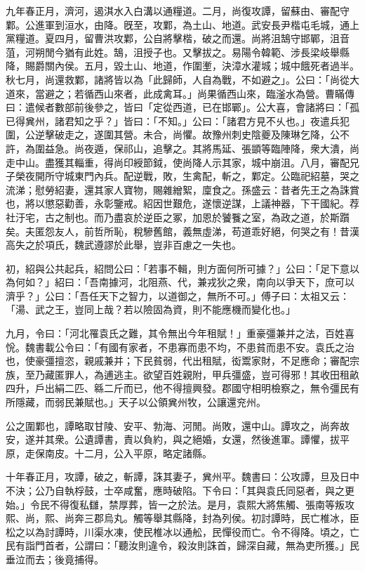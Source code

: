 \begin{pinyinscope}
九年春正月，濟河，遏淇水入白溝以通糧道。二月，尚復攻譚，留蘇由、審配守鄴。公進軍到洹水，由降。旣至，攻鄴，為土山、地道。武安長尹楷屯毛城，通上黨糧道。夏四月，留曹洪攻鄴，公自將擊楷，破之而還。尚將沮鵠守邯鄲，沮音菹，河朔閒今猶有此姓。鵠，沮授子也。又擊拔之。易陽令韓範、涉長梁岐舉縣降，賜爵關內侯。五月，毀土山、地道，作圍壍，決漳水灌城；城中餓死者過半。秋七月，尚還救鄴，諸將皆以為「此歸師，人自為戰，不如避之」。公曰：「尚從大道來，當避之；若循西山來者，此成禽耳。」尚果循西山來，臨滏水為營。曹瞞傳曰：遣候者數部前後參之，皆曰「定從西道，已在邯鄲」。公大喜，會諸將曰：「孤已得兾州，諸君知之乎？」皆曰：「不知。」公曰：「諸君方見不乆也。」夜遣兵犯圍，公逆擊破走之，遂圍其營。未合，尚懼。故豫州刺史陰夔及陳琳乞降，公不許，為圍益急。尚夜遁，保祁山，追擊之。其將馬延、張顗等臨陣降，衆大潰，尚走中山。盡獲其輜重，得尚印綬節鉞，使尚降人示其家，城中崩沮。八月，審配兄子榮夜開所守城東門內兵。配逆戰，敗，生禽配，斬之，鄴定。公臨祀紹墓，哭之流涕；慰勞紹妻，還其家人寶物，賜雜繒絮，廩食之。孫盛云：昔者先王之為誅賞也，將以懲惡勸善，永彰鑒戒。紹因世艱危，遂懷逆謀，上議神器，下干國紀。荐社汙宅，古之制也。而乃盡哀於逆臣之冢，加恩於饕餮之室，為政之道，於斯躓矣。夫匿怨友人，前哲所恥，稅驂舊館，義無虛涕，苟道乖好絕，何哭之有！昔漢高失之於項氏，魏武遵謬於此舉，豈非百慮之一失也。

初，紹與公共起兵，紹問公曰：「若事不輯，則方面何所可據？」公曰：「足下意以為何如？」紹曰：「吾南據河，北阻燕、代，兼戎狄之衆，南向以爭天下，庶可以濟乎？」公曰：「吾任天下之智力，以道御之，無所不可。」傅子曰：太祖又云：「湯、武之王，豈同上哉？若以險固為資，則不能應機而變化也。」

九月，令曰：「河北罹袁氏之難，其令無出今年租賦！」重豪彊兼并之法，百姓喜恱。魏書載公令曰：「有國有家者，不患寡而患不均，不患貧而患不安。袁氏之治也，使豪彊擅恣，親戚兼并；下民貧弱，代出租賦，衒鬻家財，不足應命；審配宗族，至乃藏匿罪人，為逋逃主。欲望百姓親附，甲兵彊盛，豈可得邪！其收田租畝四升，戶出絹二匹、緜二斤而已，他不得擅興發。郡國守相明檢察之，無令彊民有所隱藏，而弱民兼賦也。」天子以公領兾州牧，公讓還兖州。

公之圍鄴也，譚略取甘陵、安平、勃海、河閒。尚敗，還中山。譚攻之，尚奔故安，遂并其衆。公遺譚書，責以負約，與之絕婚，女還，然後進軍。譚懼，拔平原，走保南皮。十二月，公入平原，略定諸縣。

十年春正月，攻譚，破之，斬譚，誅其妻子，兾州平。魏書曰：公攻譚，旦及日中不決；公乃自執桴鼓，士卒咸奮，應時破陷。下令曰：「其與袁氏同惡者，與之更始。」令民不得復私讎，禁厚葬，皆一之於法。是月，袁熙大將焦觸、張南等叛攻熙、尚，熙、尚奔三郡烏丸。觸等舉其縣降，封為列侯。初討譚時，民亡椎冰，臣松之以為討譚時，川渠水凍，使民椎冰以通舩，民憚役而亡。令不得降。頃之，亡民有詣門首者，公謂曰：「聽汝則違令，殺汝則誅首，歸深自藏，無為吏所獲。」民垂泣而去；後竟捕得。


\end{pinyinscope}
